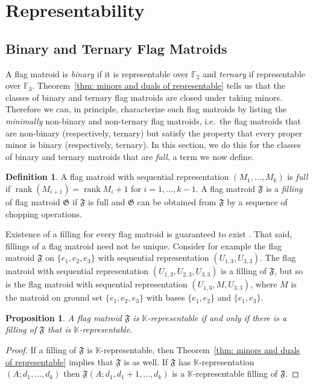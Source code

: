\documentclass[12pt]{article}
\newtheorem{prop}[thm]{Proposition}
\theoremstyle{definition}
\newtheorem{defn}[thm]{Definition}
\DeclareMathOperator{\rank}{rank}
\begin{document}
\section{Representability}\label{section: representability}
\subsection{Binary and Ternary Flag Matroids}

A flag matroid is \emph{binary} if it is representable over $\mathbb{F}_2$ and \emph{ternary} if representable over $\mathbb{F}_3$.
Theorem~\ref{thm: minors and duals of representable} tells us that the classes of binary and ternary flag matroids are closed under taking minors.
Therefore we can, in principle, characterize such flag matroids by listing the \emph{minimally} non-binary and non-ternary flag matroids,
i.e.~the flag matroids that are non-binary (respectively, ternary) but satisfy the property that every proper minor is binary (respectively, ternary).
In this section, we do this for the classes of binary and ternary matroids that are \emph{full},
a term we now define.

\begin{defn}
    A flag matroid with sequential representation $(M_1,\dots,M_k)$ is \emph{full} if $\rank(M_{i+1}) = \rank{M_i}+1$
    for $i = 1,\dots,k-1$.
    A flag matroid $\mathfrak{F}$ is a \emph{filling} of flag matroid $\mathfrak{G}$ if $\mathfrak{F}$ is full
    and $\mathfrak{G}$ can be obtained from $\mathfrak{F}$ by a sequence of chopping operations.
\end{defn}

Existence of a filling for every flag matroid is guaranteed to exist \cite[Proposition 7.3.5]{oxley}.
That said, fillings of a flag matroid need not be unique.
Consider for example the flag matroid $\mathfrak{F}$ on $\{e_1, e_2, e_3\}$ with sequential representation $(U_{1,3},U_{3,3})$.
The flag matroid with sequential representation $(U_{1,3},U_{2,3},U_{3,3})$ is a filling of $\mathfrak{F}$,
but so is the flag matroid with sequential representation $(U_{1,3}, M, U_{3,3})$, where $M$ is the matroid
on ground set $\{e_1,e_2,e_3\}$ with bases $\{e_1,e_2\}$ and $\{e_1,e_3\}$.

\begin{prop}\label{prop: representable iff filling is}
    A flag matroid $\mathfrak{F}$ is $\mathbb{K}$-representable if and only if there is a filling of $\mathfrak{F}$ that is $\mathbb{K}$-representable.
\end{prop}
\begin{proof}
    If a filling of $\mathfrak{F}$ is $\mathbb{K}$-representable, then Theorem~\ref{thm: minors and duals of representable} implies that $\mathfrak{F}$ is as well.
    If $\mathfrak{F}$ has $\mathbb{K}$-representation $(A;d_1,\dots,d_k)$ then $\mathfrak{F}(A;d_1,d_1 + 1, \dots, d_k)$ is
    a $\mathbb{K}$-representable filling of $\mathfrak{F}$.
\end{proof}
\end{document}

